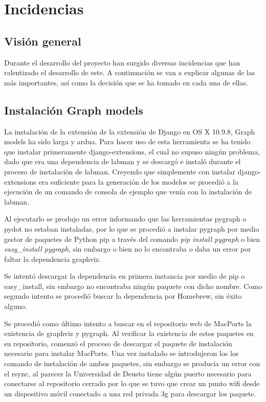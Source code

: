 \chapter{Incidencias}

\section{Visión general}

Durante el desarrollo del proyecto han surgido diversas incidencias que han ralentizado el desarrollo de este. A continuación se van a explicar algunas de las más importantes, así como la decisión que se ha tomado en cada una de ellas.

\section{Instalación Graph models}

La instalación de la extensión de la extensión de Django en OS X 10.9.8, Graph models ha sido larga y ardua. Para hacer uso de esta herramienta se ha tenido que instalar primeramente django-extensions, el cual no supuso ningún problema, dado que era una dependencia de \acrshort{labman} y se descargó e instaló durante el proceso de instalación de \acrshort{labman}. Creyendo que simplemente con instalar django-extensions era suficiente para la generación de los modelos se procedió a la ejecución de un comando de consola de ejemplo que venía con la instalación de \acrshort{labman}.

Al ejecutarlo se produjo un error informando que las herramientas pygraph o pydot no estaban instaladas, por lo que se procedió a instalar pygraph por medio gestor de paquetes de Python pip\cite{pip} a través del comando \textit{pip install pygraph} o bien \textit{easy\_install pygraph}, sin embargo o bien no lo encontraba o daba un error por faltar la dependencia graphviz.

Se intentó descargar la dependencia en primera instancia por medio de pip o easy\_install, sin embargo no encontraba ningún paquete con dicho nombre. Como segundo intento se procedió buscar la dependencia por Homebrew\cite{Homebrew}, sin éxito alguno.

Se procedió como último intento a buscar en el repositorio web de MacPorts\cite{MacPorts} la existencia de graphviz y pygraph. Al verificar la existencia de estos paquetes en su repositorio, comenzó el proceso de descargar el paquete de instalación necesario para instalar MacPorts. Una vez instalado se introdujeron los los comando de instalación de ambos paquetes, sin embargo se producía un error con el rsync, al parecer la Universidad de Deusto tiene algún puerto necesario para conectarse al repositorio cerrado por lo que se tuvo que crear un punto \acrshort{wifi} desde un dispositivo móvil conectado a una red privada \acrshort{3g} para descargar los paquete.

